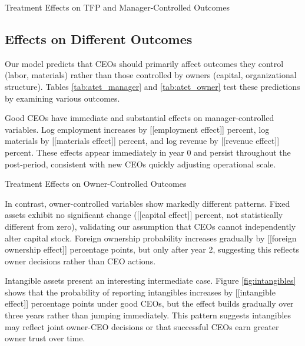 \documentclass[11pt,a4paper]{article}
\begin{document}
\begin{table}[htbp]
\centering
\caption{Treatment Effects on TFP and Manager-Controlled Outcomes}
\label{tab:atet_manager}

\end{table}

\subsection{Effects on Different Outcomes}

Our model predicts that CEOs should primarily affect outcomes they control (labor, materials) rather than those controlled by owners (capital, organizational structure). Tables \ref{tab:atet_manager} and \ref{tab:atet_owner} test these predictions by examining various outcomes.

Good CEOs have immediate and substantial effects on manager-controlled variables. Log employment increases by [[employment effect]] percent, log materials by [[materials effect]] percent, and log revenue by [[revenue effect]] percent. These effects appear immediately in year 0 and persist throughout the post-period, consistent with new CEOs quickly adjusting operational scale.

\begin{table}[htbp]
\centering
\caption{Treatment Effects on Owner-Controlled Outcomes}
\label{tab:atet_owner}

\end{table}

In contrast, owner-controlled variables show markedly different patterns. Fixed assets exhibit no significant change ([[capital effect]] percent, not statistically different from zero), validating our assumption that CEOs cannot independently alter capital stock. Foreign ownership probability increases gradually by [[foreign ownership effect]] percentage points, but only after year 2, suggesting this reflects owner decisions rather than CEO actions.

Intangible assets present an interesting intermediate case. Figure \ref{fig:intangibles} shows that the probability of reporting intangibles increases by [[intangible effect]] percentage points under good CEOs, but the effect builds gradually over three years rather than jumping immediately. This pattern suggests intangibles may reflect joint owner-CEO decisions or that successful CEOs earn greater owner trust over time.
\end{document}
